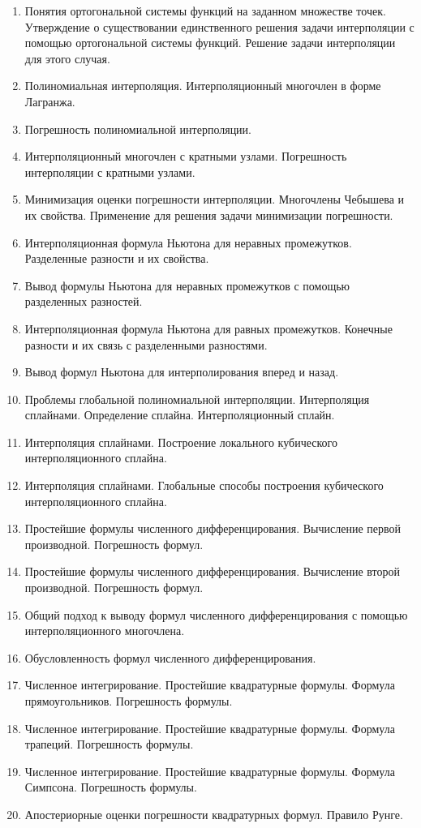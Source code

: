 \documentclass[14pt]{extarticle}
\begin{document}
\begin{enumerate}
    \item Понятия ортогональной системы функций на заданном множестве точек. Утверждение о существовании единственного решения задачи интерполяции с помощью ортогональной системы функций. Решение задачи интерполяции для этого случая. 
    \item Полиномиальная интерполяция. Интерполяционный многочлен в форме Лагранжа. 
    \item Погрешность полиномиальной интерполяции. 
    \item Интерполяционный многочлен с кратными узлами. Погрешность интерполяции с кратными узлами. 
    \item Минимизация оценки погрешности интерполяции. Многочлены Чебышева и их свойства. Применение для решения задачи минимизации погрешности. 
    \item Интерполяционная формула Ньютона для неравных промежутков. Разделенные разности и их свойства. 
    \item Вывод формулы Ньютона для неравных промежутков с помощью разделенных разностей.  
    \item Интерполяционная формула Ньютона для равных промежутков. Конечные разности и их связь с разделенными разностями. 
    \item Вывод формул Ньютона для интерполирования вперед и назад. 
    \item Проблемы глобальной полиномиальной интерполяции. Интерполяция сплайнами. Определение сплайна. Интерполяционный сплайн. 
    \item Интерполяция сплайнами. Построение локального кубического интерполяционного сплайна. 
    \item Интерполяция сплайнами. Глобальные способы построения кубического интерполяционного сплайна. 
    \item Простейшие формулы численного дифференцирования. Вычисление первой производной. Погрешность формул. 
    \item Простейшие формулы численного дифференцирования. Вычисление второй производной. Погрешность формул. 
    \item Общий подход к выводу формул численного дифференцирования с помощью интерполяционного многочлена. 
    \item Обусловленность формул численного дифференцирования. 
    \item Численное интегрирование. Простейшие квадратурные формулы. Формула прямоугольников. Погрешность формулы. 
    \item Численное интегрирование. Простейшие квадратурные формулы. Формула трапеций. Погрешность формулы. 
    \item Численное интегрирование. Простейшие квадратурные формулы. Формула Симпсона. Погрешность формулы. 
    \item Апостериорные оценки погрешности квадратурных формул. Правило Рунге.
\end{enumerate}
\end{document}
